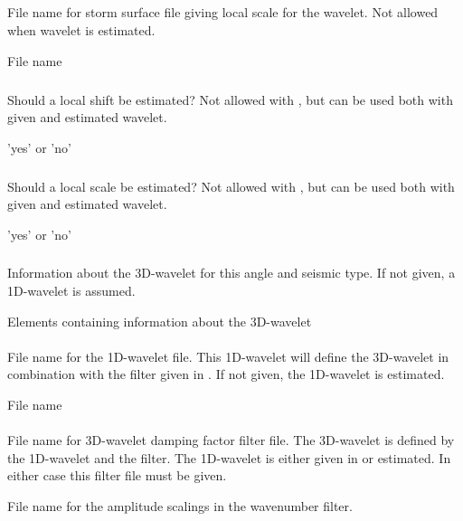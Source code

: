 \subparagraph{}
 \slist
   \item \Description File name for storm surface file giving local scale for the wavelet. Not allowed when wavelet is estimated.
   \item \Argument File name
   \item \Default
 \elist

\subparagraph{}
 \slist
   \item \Description Should a local shift be estimated? Not allowed with , but can be used both with given and estimated wavelet.
   \item \Argument 'yes' or 'no'
   \item \Default
 \elist

\subparagraph{}
 \slist
   \item \Description Should a local scale be estimated? Not allowed with , but can be used both with given and estimated wavelet.
   \item \Argument 'yes' or 'no'
   \item \Default
 \elist

\subsubsection{}
 \slist
   \item \Description Information about the 3D-wavelet for this angle and seismic type. If not given, a 1D-wavelet is assumed.
   \item \Argument Elements containing information about the 3D-wavelet
   \item \Default
 \elist

\paragraph{}
 \slist
   \item \Description File name for the 1D-wavelet file. This 1D-wavelet will define the 3D-wavelet in combination with the filter given in . If not given, the 1D-wavelet is estimated.
   \item \Argument File name
   \item \Default
 \elist

\paragraph{}
 \slist
   \item \Description File name for 3D-wavelet damping factor filter file. The 3D-wavelet is defined by the 1D-wavelet and the filter. The 1D-wavelet is either given in  or estimated. In either case this filter file must be given.
   \item \Argument File name for the amplitude scalings in the wavenumber filter.
   \item \Default
 \elist

